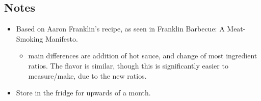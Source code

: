 \begin{multicols}{2}
\subsection*{Notes}
\begin{itemize}
    \item Based on Aaron Franklin's recipe, as seen in Franklin Barbecue: A Meat-Smoking Manifesto.
    \begin{itemize}
        \item main differences are addition of hot sauce, and change of most ingredient ratios. The flavor is similar, though this is significantly easier to measure/make, due to the new ratios.
    \end{itemize}
    \item Store in the fridge for upwards of a month.
\end{itemize}
\end{multicols}
\clearpage